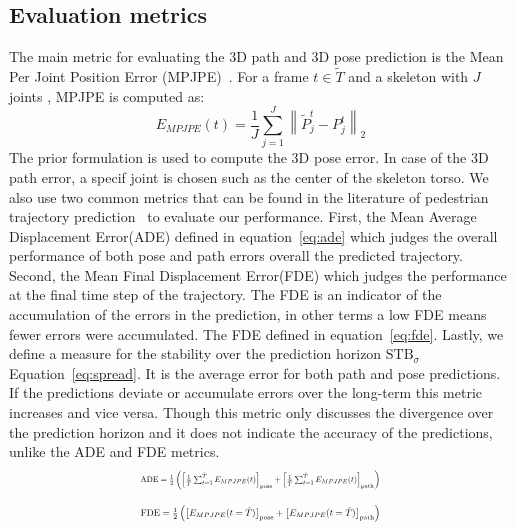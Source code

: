 \documentclass[10pt,twocolumn,letterpaper]{article}
\begin{document}
\subsection{Evaluation metrics}
The main metric for evaluating the 3D path and 3D pose prediction is the Mean Per Joint Position Error (MPJPE)~\cite{6682899}. For a frame $t \in \tilde{T}$ and a skeleton with $J$ joints , MPJPE is computed as:\begin{equation}E_{M P J P E}(t)=\frac{1}{J} \sum_{j=1}^{J}  \left \| \tilde{P}^t_j-P^t_j \right \|_2\end{equation}
The prior formulation is used to compute the 3D pose error. In case of the 3D path error, a specif joint is chosen such as the center of the skeleton torso. We also use two common metrics that can be found in the literature of pedestrian trajectory prediction~\cite{alahi2016social,gupta2018social,mohamed2020social} to evaluate our performance. First, the Mean Average Displacement Error(ADE) defined in equation~\ref{eq:ade} which judges the overall performance of both pose and path errors overall the predicted trajectory. Second, the Mean Final Displacement Error(FDE) which judges the performance at the final time step of the trajectory. The FDE is an indicator of the accumulation of the errors in the prediction, in other terms a low FDE means fewer errors were accumulated. The FDE defined in equation~\ref{eq:fde}. Lastly, we define a measure for the stability over the prediction horizon $\text{STB}_{\sigma}$ Equation~\ref{eq:spread}. It is the average error for both path and pose predictions. If the predictions deviate or accumulate errors over the long-term this metric increases and vice versa. Though this metric only discusses the divergence over the prediction horizon and it does not indicate the accuracy of the predictions, unlike the ADE and FDE metrics. 
\begin{equation}
\label{eq:ade}
\resizebox{0.5\textwidth}{!}{$\text{ADE}=\frac{1}{2}\left(\left[\frac{1}{\tilde{T}} \sum_{t=1}^{\tilde{T}} E_{M P J P E}(t) \right]_\text{pose} +\left[\frac{1}{\tilde{T}} \sum_{t=1}^{\tilde{T}} E_{M P J P E}(t) \right]_\text{path}\right)$}
\end{equation}

\begin{equation}
\label{eq:fde}
\resizebox{0.5\textwidth}{!}{$\text{FDE}=\frac{1}{2}\left(\left[ E_{M P J P E}(t=\tilde{T}) \right]_\text{pose} +\left[ E_{M P J P E}(t=\tilde{T}) \right]_\text{path}\right)$}
\end{equation}
\end{document}
